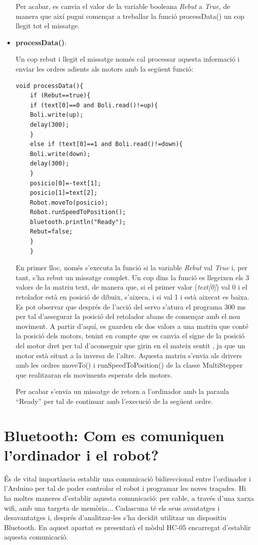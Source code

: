 \begin{itemize}
	Per acabar, es canvia el valor de la variable booleana \emph{Rebut} a \emph{True}, de manera que així pugui començar a treballar la funció processData() un cop llegit tot el missatge. 
	
	\item \textbf{processData()}:
	
	Un cop rebut i llegit el missatge només cal processar aquesta informació i enviar les ordres adients als motors amb la següent funció:
	
	\begin{lstlisting}[style=Arduino]
	void processData(){
	if (Rebut==true){
	if (text[0]==0 and Boli.read()!=up){
	Boli.write(up);
	delay(300);
	}
	else if (text[0]==1 and Boli.read()!=down){
	Boli.write(down);
	delay(300);
	}
	posicio[0]=-text[1];
	posicio[1]=text[2];
	Robot.moveTo(posicio);
	Robot.runSpeedToPosition();
	bluetooth.println("Ready");
	Rebut=false; 
	}
	}
	\end{lstlisting}
	
	En primer lloc, només s’executa la funció si la variable \emph{Rebut} val \emph{True} i, per tant, s’ha rebut un missatge complet. Un cop dins la funció es llegeixen els 3 valors de la matriu text, de manera que, si el primer valor (\emph{text[0]}) val 0 i el retolador està en posició de dibuix, s’aixeca, i si val 1 i està aixecat es baixa. Es pot observar que després de l’acció del servo s’atura el programa 300 ms per tal d’assegurar la posició del retolador abans de començar amb el nou moviment. A partir d’aquí, es guarden els dos valors a una matriu que conté la posició dels motors, tenint en compte que es canvia el signe de la posició del motor dret per tal d’aconseguir que girin en el mateix sentit , ja que un motor està situat a la inversa de l’altre. Aquesta matriu s’envia als drivers amb les ordres moveTo() i runSpeedToPosition() de la classe MultiStepper que realitzaran els moviments esperats dels motors. 
	
	Per acabar s’envia un missatge de retorn a l’ordinador amb la paraula “Ready” per tal de continuar amb l’execució de la següent ordre. 
	
	
\end{itemize}

\section{Bluetooth: Com es comuniquen l'ordinador i el robot?}

És de vital importància establir una comunicació bidireccional entre l’ordinador i l’Arduino per tal de poder controlar el robot i programar les noves traçades. Hi ha moltes maneres d’establir aquesta comunicació: per cable, a través d’una xarxa wifi, amb una targeta de memòria... Cadascuna té els seus avantatges i desavantatges i, després d’analitzar-les s’ha decidit utilitzar un dispositiu Bluetooth. En aquest apartat es presentarà el mòdul HC-05 encarregat d’establir aquesta comunicació.

